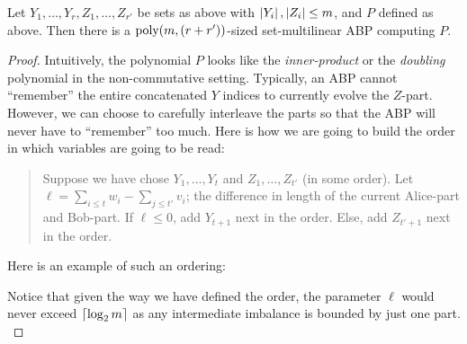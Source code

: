 \begin{lemma}
  Let $Y_1,\ldots, Y_r, Z_1,\ldots, Z_{r'}$ be sets as above with $\left|Y_i\right|, \left|Z_i\right| \leq m$, and $P$ defined as above. Then there is a $\operatorname{poly}(m, (r+r'))$-sized set-multilinear ABP computing $P$. 
\end{lemma}
\begin{proof}
  Intuitively, the polynomial $P$ looks like the \emph{inner-product} or the \emph{doubling} polynomial in the non-commutative setting. Typically, an ABP cannot ``remember'' the entire concatenated $Y$ indices to currently evolve the $Z$-part. However, we can choose to carefully interleave the parts so that the ABP will never have to ``remember'' too much. Here is how we are going to build the order in which variables are going to be read:
  \begin{quote}
    Suppose we have chose $Y_1,\ldots, Y_t$ and $Z_1,\ldots, Z_{t'}$ (in some order). Let $\ell = \sum_{i \leq t} w_i - \sum_{j \leq t'} v_i$; the difference in length of the current Alice-part and Bob-part. If $\ell\leq 0$, add $Y_{t+1}$ next in the order. Else, add $Z_{t'+1}$ next in the order. 
  \end{quote}

\noindent Here is an example of such an ordering:\\
  
  
  Notice that given the way we have defined the order, the parameter $\ell$ would never exceed $\lceil \log_2m \rceil$ as any intermediate imbalance is bounded by just one part.\\


\end{proof}
